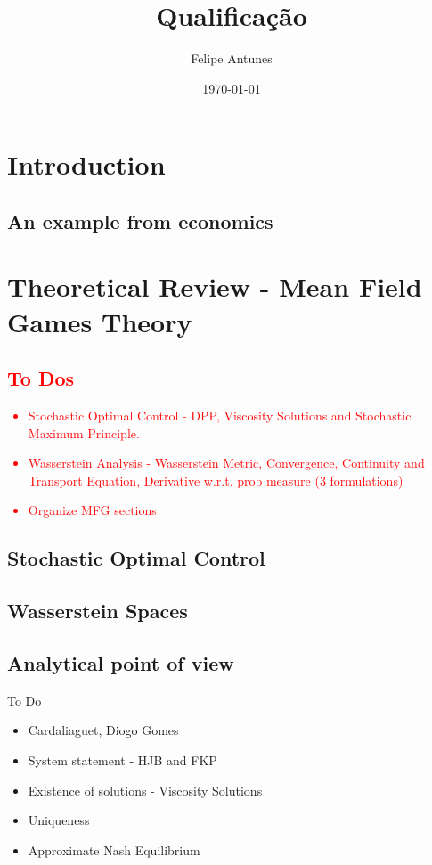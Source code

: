 \documentclass{article}
\title{Qualificação}
\author{Felipe Antunes}
\date{\today}
\begin{document}
\maketitle


\section{Introduction}


\subsection{An example from economics}


\section{Theoretical Review - Mean Field Games Theory}


\textcolor{red}{
\subsection{To Dos}
\begin{itemize}
    \item Stochastic Optimal Control - DPP, Viscosity Solutions and Stochastic Maximum Principle.
    \item  Wasserstein Analysis - Wasserstein Metric, Convergence, Continuity and Transport Equation, Derivative w.r.t. prob measure (3 formulations)
    \item Organize MFG sections
\end{itemize}}

\subsection{Stochastic Optimal Control}\label{theo_review:soc}



\subsection{Wasserstein Spaces}\label{theo_review:wass}


\subsection{Analytical point of view}
To Do
\begin{itemize}
    \item Cardaliaguet, Diogo Gomes
    \item System statement - HJB and FKP
    \item Existence of solutions - Viscosity Solutions
    \item Uniqueness
    \item Approximate Nash Equilibrium
\end{itemize}
\end{document}
